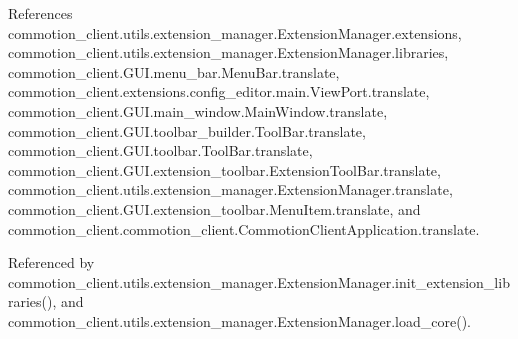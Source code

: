 References commotion\+\_\+client.\+utils.\+extension\+\_\+manager.\+Extension\+Manager.\+extensions, commotion\+\_\+client.\+utils.\+extension\+\_\+manager.\+Extension\+Manager.\+libraries, commotion\+\_\+client.\+G\+U\+I.\+menu\+\_\+bar.\+Menu\+Bar.\+translate, commotion\+\_\+client.\+extensions.\+config\+\_\+editor.\+main.\+View\+Port.\+translate, commotion\+\_\+client.\+G\+U\+I.\+main\+\_\+window.\+Main\+Window.\+translate, commotion\+\_\+client.\+G\+U\+I.\+toolbar\+\_\+builder.\+Tool\+Bar.\+translate, commotion\+\_\+client.\+G\+U\+I.\+toolbar.\+Tool\+Bar.\+translate, commotion\+\_\+client.\+G\+U\+I.\+extension\+\_\+toolbar.\+Extension\+Tool\+Bar.\+translate, commotion\+\_\+client.\+utils.\+extension\+\_\+manager.\+Extension\+Manager.\+translate, commotion\+\_\+client.\+G\+U\+I.\+extension\+\_\+toolbar.\+Menu\+Item.\+translate, and commotion\+\_\+client.\+commotion\+\_\+client.\+Commotion\+Client\+Application.\+translate.



Referenced by commotion\+\_\+client.\+utils.\+extension\+\_\+manager.\+Extension\+Manager.\+init\+\_\+extension\+\_\+libraries(), and commotion\+\_\+client.\+utils.\+extension\+\_\+manager.\+Extension\+Manager.\+load\+\_\+core().


